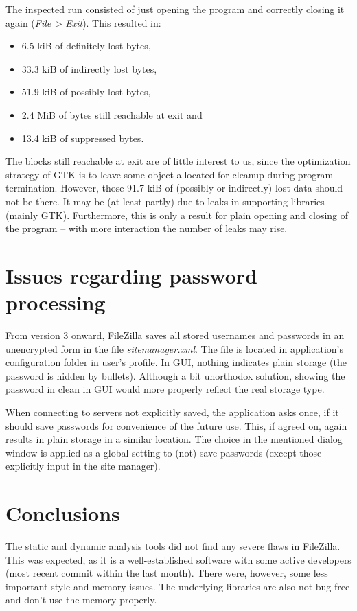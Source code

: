 \documentclass[11pt]{article}
\begin{document}
The inspected run consisted of just opening the program and correctly closing it again (\textit{File > Exit}). This resulted in:
\begin{itemize}[topsep=0pt, itemsep=0pt]
\item 6.5 kiB of definitely lost bytes,
\item 33.3 kiB of indirectly lost bytes,
\item 51.9 kiB of possibly lost bytes,
\item 2.4 MiB of bytes still reachable at exit and
\item 13.4 kiB of suppressed bytes.
\end{itemize}
\noindent
The blocks still reachable at exit are of little interest to us, since the optimization strategy of GTK is to leave some object allocated for cleanup during program termination. However, those 91.7 kiB of (possibly or indirectly) lost data should not be there. It may be (at least partly) due to leaks in supporting libraries (mainly GTK). Furthermore, this is only a result for plain opening and closing of the program -- with more interaction the number of leaks may rise.

\section{Issues regarding password processing}

From version 3 onward, FileZilla saves all stored usernames and passwords in an unencrypted form in the file \textit{sitemanager.xml}. The file is located in application's configuration folder in user's profile. In GUI, nothing indicates plain storage (the password is hidden by bullets). Although a bit unorthodox solution, showing the password in clean in GUI would more properly reflect the real storage type.

When connecting to servers not explicitly saved, the application asks once, if it should save passwords for convenience of the future use. This, if agreed on, again results in plain storage in a similar location. The choice in the mentioned dialog window is applied as a global setting to (not) save passwords (except those explicitly input in the site manager).

\section{Conclusions}

The static and dynamic analysis tools did not find any severe flaws in FileZilla. This was expected, as it is a well-established software with some active developers (most recent commit within the last month). There were, however, some less important style and memory issues. The underlying libraries are also not bug-free and don't use the memory properly.
\end{document}
